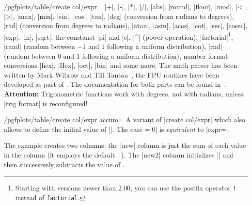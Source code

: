 \begin{stylekey}{/pgfplots/table/create col/expr=}
    |+|, |-|, |*|, |/|, |abs|, |round|, |floor|, |mod|, |<|, |>|, |max|, |min|,
    |sin|, |cos|, |tan|, |deg| (conversion from radians to degrees), |rad|
    (conversion from degrees to radians), |atan|, |asin|, |acos|, |cot|, |sec|,
    |cosec|, |exp|, |ln|, |sqrt|, the constanst |pi| and |e|, |^| (power
    operation), |factorial|\footnote{Starting with \PGF{} versions newer than
    $2.00$, you can use the postfix operator \texttt{!} instead of
    \texttt{factorial}.}, |rand| (random between $-1$ and $1$ following a
    uniform distribution), |rnd| (random between $0$ and $1$ following a
    uniform distribution), number format conversions |hex|, |Hex|, |oct|, |bin|
    and some more. The math parser has been written by Mark Wibrow and Till
    Tantau~\cite{tikz}, the FPU routines have been developed as part of
    \PGFPlots{}. The documentation for both parts can be found in~\cite{tikz}.
    \textbf{Attention:} Trigonometric functions work with degrees, not with
    radians, unless |trig format| is reconfigured!
\end{stylekey}

\begin{stylekey}{/pgfplots/table/create col/expr accum=}
    A variant of |create col/expr| which also allows to define the initial
    value of |\pgfmathaccuma|. The case =|0| is
    \emph{equivalent} to |expr=|.
\begin{codeexample}[pre={\begin{lateximage}},post={\end{lateximage}}]

\end{codeexample}
    The example creates two columns: the |new| column is just the sum of each
    value in the  column (it employs the default
    ||). The |new2| column initializes || and
    then successively subtracts the value of .
\end{stylekey}

